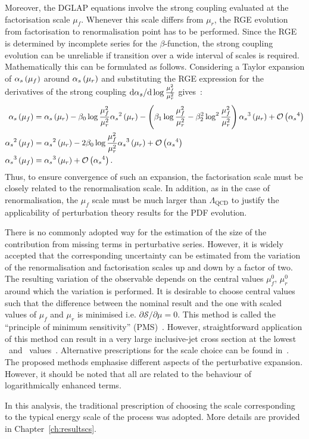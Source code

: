 Moreover, the DGLAP equations involve the strong coupling evaluated at the factorisation scale $\mu_f$. Whenever this scale differs from $\mu_r$, the RGE evolution from factorisation to renormalisation point has to be performed. Since the RGE is determined by incomplete series for the $\beta$-function, the strong coupling evolution can be unreliable if transition over a wide interval of scales is required. Mathematically this can be formulated as follows. Considering a Taylor expansion of $\mbox{$\alpha_{s}$}\left(\mu_f\right)$ around $\mbox{$\alpha_{s}$}\left(\mu_r\right)$ and substituting the RGE expression for the derivatives of the strong coupling $\mathrm{d}\mbox{$\alpha_{s}$}/\mathrm{d}\log{\frac{\mu_f^2}{\mu_r^2}}$ gives~\cite{Botje:2010ay}:
{\small
\begin{align}
 \mbox{$\alpha_{s}$}\left(\mu_f\right) &= \mbox{$\alpha_{s}$}\left(\mu_r\right) - \beta_0\log{\frac{\mu_f^2}{\mu_r^2}}\mbox{$\alpha_{s}$}^2\left(\mu_r\right) - \left(\beta_1\log{\frac{\mu_f^2}{\mu_r^2}} - \beta_2^2\log^2{\frac{\mu_f^2}{\mu_r^2}}\right)\mbox{$\alpha_{s}$}^3\left(\mu_r\right) + \mathcal{O}\left(\mbox{$\alpha_{s}$}^4\right)\\ \nonumber
 \mbox{$\alpha_{s}$}^2\left(\mu_f\right) & = \mbox{$\alpha_{s}$}^2\left(\mu_r\right) - 2\beta_0\log{\frac{\mu_f^2}{\mu_r^2}}\mbox{$\alpha_{s}$}^3\left(\mu_r\right) + \mathcal{O}\left(\mbox{$\alpha_{s}$}^4\right)\\
\mbox{$\alpha_{s}$}^3\left(\mu_f\right) & = \mbox{$\alpha_{s}$}^3\left(\mu_r\right) + \mathcal{O}\left(\mbox{$\alpha_{s}$}^4\right).
\end{align}
}
Thus, to ensure convergence of such an expansion, the factorisation scale must be closely related to the renormalisation scale. In addition, as in the case of renormalisation, the $\mu_f$ scale must be much larger than $\Lambda_\mathrm{QCD}$ to justify the applicability of perturbation theory results for the PDF evolution.

There is no commonly adopted way for the estimation of the size of the contribution from missing terms in perturbative series. However, it is widely accepted that the corresponding uncertainty can be estimated from the variation of the renormalisation and factorisation scales up and down by a factor of two. The resulting variation of the observable depends on the central values $\mu_{f}^{0},\,\mu_{r}^{0}$ around which the variation is performed. It is desirable to choose central values such that the difference between the nominal result and the one with scaled values of $\mu_f$ and $\mu_r$ is minimised i.e. $\partial\mathcal{S}/\partial\mu=0$. This method is called the ``principle of minimum sensitivity'' (PMS)~\cite{Stevenson:1980du}. However, straightforward application of this method can result in a very large inclusive-jet cross section at the lowest \qsq~and \etjet~values~\cite{thesis:britzger:2013}. Alternative prescriptions for the scale choice can be found in~\cite{Ioffe:2010zz}. The proposed methods emphasise different aspects of the perturbative expansion. However, it should be noted that all are related to the behaviour of logarithmically enhanced terms.

In this analysis, the traditional prescription of choosing the scale corresponding to the typical energy scale of the process was adopted. More details are provided in Chapter~\ref{ch:resultscs}.
